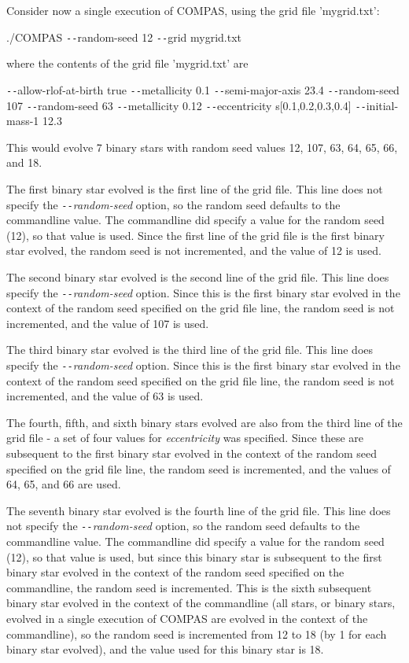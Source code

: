 Consider now a single execution of COMPAS, using the grid file 'mygrid.txt':

\tabto{3em}./COMPAS \texttt{-{}-}random-seed 12 \texttt{-{}-}grid mygrid.txt

\bigskip
where the contents of the grid file 'mygrid.txt' are

\tabto{3em}\texttt{-{}-}allow-rlof-at-birth true \texttt{-{}-}metallicity 0.1
\tabto{3em}\texttt{-{}-}semi-major-axis 23.4 \texttt{-{}-}random-seed 107
\tabto{3em}\texttt{-{}-}random-seed 63 \texttt{-{}-}metallicity 0.12 \texttt{-{}-}eccentricity s[0.1,0.2,0.3,0.4]
\tabto{3em}\texttt{-{}-}initial-mass-1 12.3

\bigskip
This would evolve 7 binary stars with random seed values 12, 107, 63, 64, 65, 66, and 18.

The first binary star evolved is the first line of the grid file. This line does not specify the \textit{\texttt{-{}-}random-seed} option, so the random seed defaults to the commandline value. The commandline did specify a value for the random seed (12), so that value is used. Since the first line of the grid file is the first binary star evolved, the random seed is not incremented, and the value of 12 is used.

The second binary star evolved is the second line of the grid file. This line does specify the \textit{\texttt{-{}-}random-seed} option. Since this is the first binary star evolved in the context of the random seed specified on the grid file line, the random seed is not incremented, and the value of 107 is used.

The third binary star evolved is the third line of the grid file. This line does specify the \textit{\texttt{-{}-}random-seed} option. Since this is the first binary star evolved in the context of the random seed specified on the grid file line, the random seed is not incremented, and the value of 63 is used.

The fourth, fifth, and sixth binary stars evolved are also from the third line of the grid file - a set of four values for \textit{eccentricity} was specified. Since these are subsequent to the first binary star evolved in the context of the random seed specified on the grid file line, the random seed is incremented, and the values of 64, 65, and 66 are used.

The seventh binary star evolved is the fourth line of the grid file. This line does not specify the \textit{\texttt{-{}-}random-seed} option, so the random seed defaults to the commandline value. The commandline did specify a value for the random seed (12), so that value is used, but since this binary star is subsequent to the first binary star evolved in the context of the random seed specified on the commandline, the random seed is incremented. This is the sixth subsequent binary star evolved in the context of the commandline (all stars, or binary stars, evolved in a single execution of COMPAS are evolved in the context of the commandline), so  the random seed is incremented from 12 to 18 (by 1 for each binary star evolved), and the value used for this binary star is 18.

